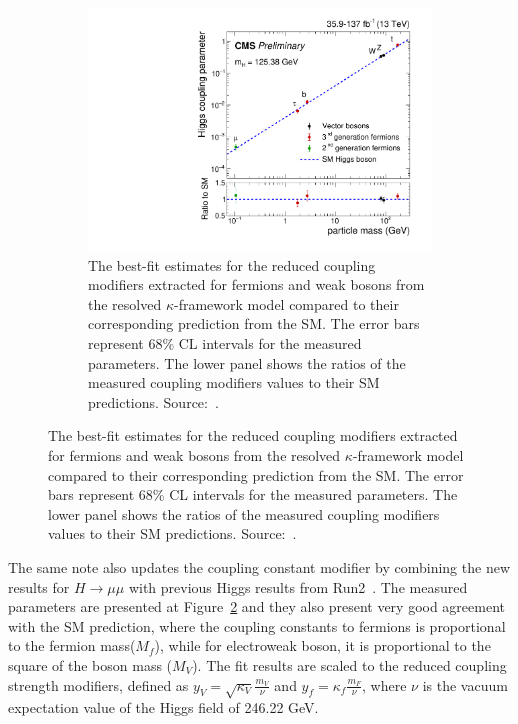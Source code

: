 \begin{figure}[htbp]
  \hfill
  \begin{subfigure}[htbp]{0.48\textwidth}
    \centering
    \includegraphics[width=\textwidth]{figures_and_tables/theory/higgs_coups.pdf}
    \caption{The best-fit estimates for the reduced coupling modifiers extracted for fermions and weak bosons from the resolved $\kappa$-framework model compared to their corresponding prediction from the SM. The error bars represent 68\% CL intervals for the measured parameters. The lower panel shows the ratios of the measured coupling modifiers values to their SM predictions. Source:~\cite{cms_higgs_mumu}.}
    \label{higgs_coups}
  \end{subfigure}
\end{figure}

The same note also updates the coupling constant modifier by combining the new results for $H \rightarrow \mu\mu$ with previous Higgs results from Run2~\cite{cms_higgs_comb_run2}. The measured parameters are presented at Figure~\ref{higgs_coups} and they also present very good agreement with the SM prediction, where the coupling constants to fermions is proportional to the fermion mass($M_{f}$), while for electroweak boson, it is proportional to the square of the boson mass ($M_{V}$). The fit results are scaled to the reduced coupling strength modifiers, defined as $y_V=\sqrt{\kappa_V}\frac{m_V}{\nu}$ and $y_f=\kappa_f\frac{m_F}{\nu}$, where $\nu$ is the vacuum expectation value of the Higgs field of 246.22 GeV.
